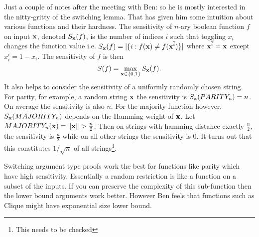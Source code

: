 \documentclass[11pt]{article}
\begin{document}
	Just a couple of notes after the meeting with Ben: so he is mostly interested in the nitty-gritty of the switching lemma. That has given him some intuition about various functions and their hardness. The sensitivity of $n$-ary boolean function $f$ on input $\mathbf{x}$, denoted $S_{\mathbf{x}}(f)$, is the number of indices $i$ such that toggling $x_i$ changes the function value i.e. $S_{\mathbf{x}}(f) = |\{i: f(\mathbf{x}) \neq f(\mathbf{x}^{\overline{i}})\}|$ where $\mathbf{x}^{\overline{i}} = \mathbf{x}$ except $x_i^{\overline{i}} = 1 - x_i$. The sensitivity of $f$ is then
	\[S(f) = \max_{\mathbf{x} \in \{0,1\}} S_{\mathbf{x}}(f).\]
	It also helps to consider the sensitivity of a uniformly randomly chosen string. For parity, for example, a random string $\mathbf{x}$ the sensitivity is $S_{\mathbf{x}}(PARITY_n) = n$. On average the sensitivity is also $n$. For the majority function however, $S_{\mathbf{x}}(MAJORITY_n)$ depends on the Hamming weight of $\mathbf{x}$. Let $MAJORITY_n(\mathbf{x}) = \lVert\mathbf{x}\rVert > \frac{n}{2}$. Then on strings with hamming distance exactly $\frac{n}{2}$, the sensitivity is $\frac{n}{2}$ while on all other strings the sensitivity is $0$. It turns out that this constitutes $1/\sqrt{n}$ of all strings\footnote{This needs to be checked}.    
	
	Switching argument type proofs work the best for functions like parity which have high sensitivity. Essentially a random restriction is like a function on a subset of the inputs. If you can preserve the complexity of this sub-function then the lower bound arguments work better. However Ben feels that functions such as Clique might have exponential size lower bound. 
	  
\end{document}
